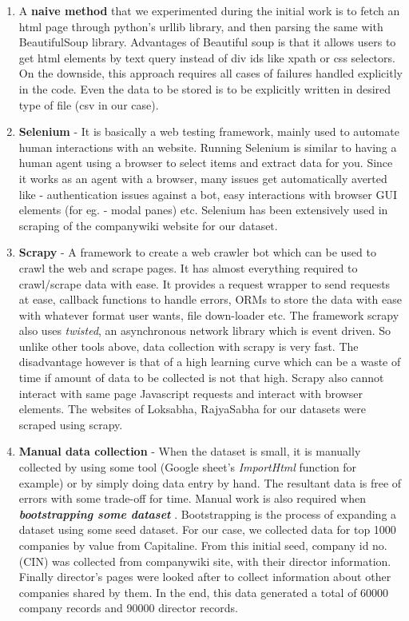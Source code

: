 \begin{enumerate}

    \item A \textbf{ naive method } that we experimented during the initial work is to fetch an html page through python's urllib library, and then parsing the same with BeautifulSoup library. Advantages of Beautiful soup is that it allows users to get html elements by text query instead of div ids like xpath or css selectors. On the downside, this approach requires all cases of failures handled explicitly in the code. Even the data to be stored is to be explicitly written in desired type of file (csv in our case).

    \item \textbf{Selenium} - It is basically a web testing framework, mainly used to automate human interactions with an website. Running Selenium is similar to having a human agent using a browser to select items and extract data for you. Since it works as an agent with a browser, many issues get automatically averted like - authentication issues against a bot, easy interactions with browser GUI elements (for eg. - modal panes) etc. Selenium has been extensively used in scraping of the companywiki website for our dataset.

    \item \textbf{Scrapy} - A framework to create a web crawler bot which can be used to crawl the web and scrape pages. It has almost everything required to crawl/scrape data with ease. It provides a request wrapper to send requests at ease, callback functions to handle errors, ORMs to store the data with ease with whatever format user wants, file down-loader etc. The framework scrapy also uses \emph{twisted}, an asynchronous network library which is event driven. So unlike other tools above, data collection with scrapy is very fast. The disadvantage however is that of a high learning curve which can be a waste of time if amount of data to be collected is not that high. Scrapy also cannot interact with same page Javascript requests and interact with browser elements. The websites of Loksabha, RajyaSabha for our datasets were scraped using scrapy.

    \item \textbf{Manual data collection} - When the dataset is small, it is manually collected by using some tool (Google sheet's \emph{ ImportHtml } function for example) or by simply doing data entry by hand. The resultant data is free of errors with some trade-off for time. Manual work is also required when \textbf {\emph {bootstrapping some dataset} }. Bootstrapping is the process of expanding a dataset using some seed dataset. For our case, we collected data for top 1000 companies by value from Capitaline. From this initial seed, company id no. (CIN) was collected from companywiki site, with their director information. Finally director's pages were looked after to collect information about other companies shared by them. In the end, this data generated a total of 60000 company records and 90000 director records.


\end{enumerate}
